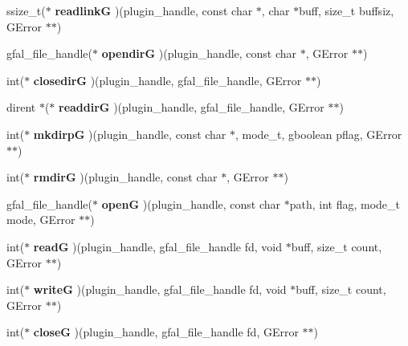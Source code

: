 \begin{CompactItemize}
\item 
ssize\_\-t($\ast$ \textbf{readlink\-G} )(plugin\_\-handle, const char $\ast$, char $\ast$buff, size\_\-t buffsiz, GError $\ast$$\ast$)\label{struct__gfal__plugin__interface_bea2af03bf457f18bb6576ee8dc918a3}

\item 
gfal\_\-file\_\-handle($\ast$ \textbf{opendir\-G} )(plugin\_\-handle, const char $\ast$, GError $\ast$$\ast$)\label{struct__gfal__plugin__interface_e651878dc579a4a7d40bb928a3d2cecd}

\item 
int($\ast$ \textbf{closedir\-G} )(plugin\_\-handle, gfal\_\-file\_\-handle, GError $\ast$$\ast$)\label{struct__gfal__plugin__interface_6c4803547cc326897d7535c7ccb15fe2}

\item 
dirent $\ast$($\ast$ \textbf{readdir\-G} )(plugin\_\-handle, gfal\_\-file\_\-handle, GError $\ast$$\ast$)\label{struct__gfal__plugin__interface_738e301f6073aca875b2bebc37f1be9c}

\item 
int($\ast$ \textbf{mkdirp\-G} )(plugin\_\-handle, const char $\ast$, mode\_\-t, gboolean pflag, GError $\ast$$\ast$)\label{struct__gfal__plugin__interface_cc4f3b17ce3b809ec001fb603a3fc7b4}

\item 
int($\ast$ \textbf{rmdir\-G} )(plugin\_\-handle, const char $\ast$, GError $\ast$$\ast$)\label{struct__gfal__plugin__interface_a0042558b6182daee4f0c953097ce56f}

\item 
gfal\_\-file\_\-handle($\ast$ \textbf{open\-G} )(plugin\_\-handle, const char $\ast$path, int flag, mode\_\-t mode, GError $\ast$$\ast$)\label{struct__gfal__plugin__interface_516c2debbc66416f16288ebc983399f0}

\item 
int($\ast$ \textbf{read\-G} )(plugin\_\-handle, gfal\_\-file\_\-handle fd, void $\ast$buff, size\_\-t count, GError $\ast$$\ast$)\label{struct__gfal__plugin__interface_b3b7bd76e2e692533531fcb53b142bfa}

\item 
int($\ast$ \textbf{write\-G} )(plugin\_\-handle, gfal\_\-file\_\-handle fd, void $\ast$buff, size\_\-t count, GError $\ast$$\ast$)\label{struct__gfal__plugin__interface_18999bb57a5bbe8c0a0f171f36f15fac}

\item 
int($\ast$ \textbf{close\-G} )(plugin\_\-handle, gfal\_\-file\_\-handle fd, GError $\ast$$\ast$)\label{struct__gfal__plugin__interface_036b74d493f02804c855681e6d4dc174}


\end{CompactItemize}
